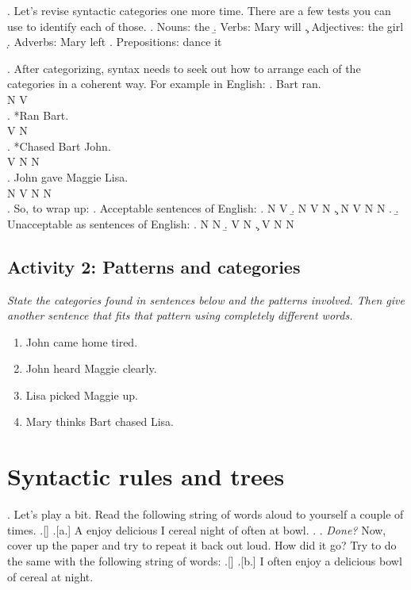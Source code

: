 \documentclass[11pt, oneside]{article}   	%
\begin{document}
\ex. Let's revise syntactic categories one more time. There are a few tests you can use to identify each of those.
	\a. Nouns: the \underline{\hspace{1cm}}
	\b. Verbs: Mary will \underline{\hspace{1cm}}
	\c. Adjectives: the \underline{\hspace{1cm}} girl
	\d. Adverbs: Mary \underline{\hspace{1cm}} left
	\e. Prepositions: dance \underline{\hspace{1cm}} it

\ex. After categorizing, syntax needs to seek out how to arrange each of the categories in a coherent way. For example in English:
\ag. Bart ran. \\
N V \\
\bg. *Ran Bart. \\
V N \\ 
\cg. *Chased Bart John. \\
V N N \\
\dg. John gave Maggie Lisa. \\
N V N N \\

\ex. So, to wrap up:
	\a. Acceptable sentences of English:
		\a. N V
		\b. N V N
		\c. N V N N
		\z.
	\b. Unacceptable as sentences of English:
		\a. N N
		\b. V N
		\c. V N N

\subsection{Activity 2: Patterns and categories}
		
{\itshape State the categories found in sentences below and the patterns involved. Then give another sentence that fits that pattern using completely different words.}

\begin{enumerate}
\item John came home tired.
\item John heard Maggie clearly.
\item Lisa picked Maggie up.
\item Mary thinks Bart chased Lisa.
\end{enumerate}

\section{Syntactic rules and trees}

\ex. Let's play a bit. Read the following string of words aloud to yourself a couple of times.
	\a.[]
		\a.[a.] A enjoy delicious I cereal night of often at bowl.
		\z.
	\z.
{\em Done?} Now, cover up the paper and try to repeat it back out loud. How did it go? Try to do the same with the following string of words:
	\a.[]
		\a.[b.] I often enjoy a delicious bowl of cereal at night.
		
\end{document}
